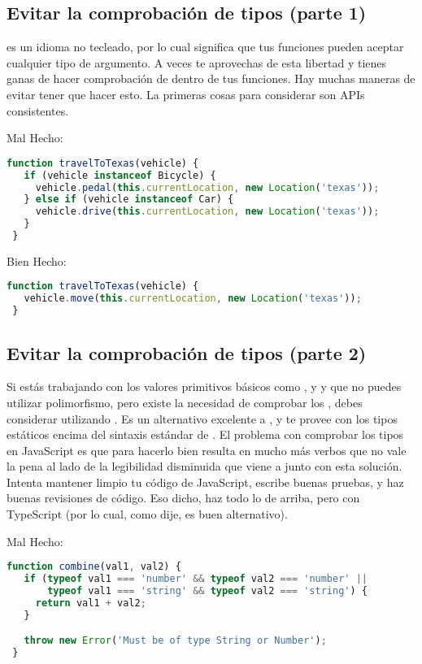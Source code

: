 \subsection*{Evitar la comprobación de tipos (parte 1)}

 es un idioma no tecleado, por lo cual significa que tus funciones pueden aceptar cualquier tipo de argumento. A veces te aprovechas de esta libertad y tienes ganas de hacer comprobación de  dentro de tus funciones. Hay muchas maneras de evitar tener que hacer esto. La primeras cosas para considerar son APIs consistentes.

Mal Hecho:
\begin{lstlisting}[language=TypeScript, style=badstyle]
 function travelToTexas(vehicle) {
   if (vehicle instanceof Bicycle) {
     vehicle.pedal(this.currentLocation, new Location('texas'));
   } else if (vehicle instanceof Car) {
     vehicle.drive(this.currentLocation, new Location('texas'));
   }
 }
\end{lstlisting}
\vspace{0.5cm} %

Bien Hecho:
\begin{lstlisting}[language=TypeScript, style=goodstyle]
 function travelToTexas(vehicle) {
   vehicle.move(this.currentLocation, new Location('texas'));
 }
\end{lstlisting}

\subsection*{Evitar la comprobación de tipos (parte 2)}

Si estás trabajando con los valores primitivos básicos como ,  y  y que no puedes utilizar polimorfismo, pero existe la necesidad de comprobar los , debes considerar utilizando . Es un alternativo excelente a , y te provee con los tipos estáticos encima del sintaxis estándar de . El problema con comprobar los tipos en JavaScript es que para hacerlo bien resulta en mucho más verbos que no vale la pena al lado de la legibilidad disminuida que viene a junto con esta solución. Intenta mantener limpio tu código de JavaScript, escribe buenas pruebas, y haz buenas revisiones de código. Eso dicho, haz todo lo de arriba, pero con TypeScript (por lo cual, como dije, es buen alternativo).

Mal Hecho:
\begin{lstlisting}[language=TypeScript, style=badstyle]
 function combine(val1, val2) {
   if (typeof val1 === 'number' && typeof val2 === 'number' ||
       typeof val1 === 'string' && typeof val2 === 'string') {
     return val1 + val2;
   }

   throw new Error('Must be of type String or Number');
 }
\end{lstlisting}
\newpage

